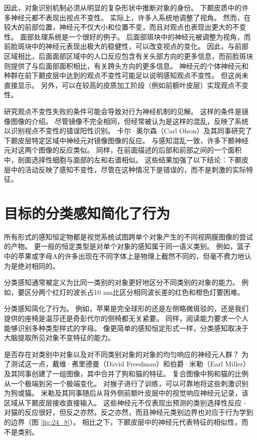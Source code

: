 因此，对象识别机制必须从明显的复杂形状中推断对象的身份。
下颞皮质中的许多神经元都不表现出视点不变性。 实际上，许多人系统地调整了视角。
然而，在较大的前部位置，神经元不仅大小和位置不变，而且对观点也表现出更大的不变性。
面部处理系统是一个很好的例子。
后面部斑块中的神经元被调整为视角，而前脸斑块中的神经元表现出极大的稳健性，可以改变视点的变化。
因此，与前部区域相比，后面面部区域中的人口反应包含有关头部方向的更多信息，而前脸斑块则提供了与后面部面积相比，有关跨头方向的更多信息。
神经元的个体神经元和种群在前下颞皮层中达到的观点不变性可能足以说明感知观点不变性。
但这尚未直接显示。
另外，可以在较高的皮质加工阶段（例如前额叶皮层）实现观点不变性。


研究观点不变性失败的条件可能会导致对行为神经机制的见解。
这样的条件是镜像图像的介绍。
尽管镜像不完全相同，但经常被认为是这样的混乱，反映了系统以识别视点不变性的错误阳性识别。
卡尔·奥尔森（Carl Olson）及其同事研究了下颞皮层特定区域中神经元对镜像图像的反应。
与感知混乱一致，许多下颞神经元对这两个图像的反应类似。
同样，在前面描述的后部和前部之间的一个面积中，剖面选择性细胞与面部的左和右谱相似。
这些结果加强了以下结论：下颞皮层中的活动反映了感知不变性，尽管在这种情况下是错误的，而不是刺激的实际特征。



\section{目标的分类感知简化了行为}

所有形式的感知恒定物都是视觉系统试图跨单个对象产生的不同视网膜图像的尝试的产物。
更一般的恒定类型是对单个对象的感知属于同一语义类别。
例如，篮子中的苹果或字母A的许多出现在不同字体上是物理上截然不同的，但毫不费力地认为是绝对相同的。


分类感知通常被定义为比同一类别的对象更好地区分不同类别的对象的能力。
例如，要区分两个红灯的波长占10 nm比区分相同波长差的红色和橙色灯要困难。


分类感知简化了行为。
例如，苹果是完全球形的还是左侧略微斑驳的，还是我们提供的座椅是温莎还是奇彭代尔的侧椅都无关紧要。
同样，阅读能力要求一个人能够识别多种类型样式的字母。
像更简单的感知恒定形式一样，分类感知取决于大脑提取所见对象不变特征的能力。


是否存在对类别中对象以及对不同类别对象的对象的均匀响应的神经元人群？
为了测试这一点，戴维·弗里德曼（David Freedman）和伯爵·米勒（Earl Miller）及其同事创建了一组图像，其中合并了狗和猫的特征。
复合图像中狗和猫的比例从一个极端到另一个极端变化。 
对猴子进行了训练，可以可靠地将这些刺激识别为狗或猫。
米勒及其同事随后从背外侧前额叶皮层中的视觉响应神经元记录，该区域从下颞皮层接收直接输入。
这些神经元不仅表现出预测的类别选择性反应 - 对猫的反应很好，但反之亦然，反之亦然，而且神经元类别边界也对应于行为学到的边界（图 \ref{fig:24_8}）。 
相比之下，下颞皮层中的神经元代表特征的相似性，而不是类别。


